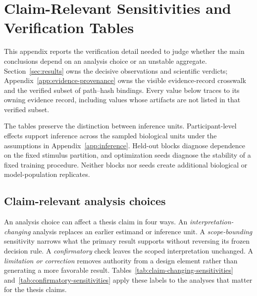 \section{Claim-Relevant Sensitivities and Verification Tables}
\label{app:sensitivities}

This appendix reports the verification detail needed to judge whether the main conclusions depend on an analysis choice or an unstable aggregate.
Section~\ref{sec:results} owns the decisive observations and scientific verdicts; Appendix~\ref{app:evidence-provenance} owns the visible evidence-record crosswalk and the verified subset of path--hash bindings.
Every value below traces to its owning evidence record, including values whose artifacts are not listed in that verified subset.

 The tables preserve the distinction between inference units.
Participant-level effects support inference across the sampled biological units under the assumptions in Appendix~\ref{app:inference}.
Held-out blocks diagnose dependence on the fixed stimulus partition, and optimization seeds diagnose the stability of a fixed training procedure.
Neither blocks nor seeds create additional biological or model-population replicates.

\subsection{Claim-relevant analysis choices}

An analysis choice can affect a thesis claim in four ways.
An \emph{interpretation-changing} analysis replaces an earlier estimand or inference unit.
A \emph{scope-bounding} sensitivity narrows what the primary result supports without reversing its frozen decision rule.
A \emph{confirmatory} check leaves the scoped interpretation unchanged.
A \emph{limitation or correction} removes authority from a design element rather than generating a more favorable result.
Tables~\ref{tab:claim-changing-sensitivities} and~\ref{tab:confirmatory-sensitivities} apply these labels to the analyses that matter for the thesis claims.

